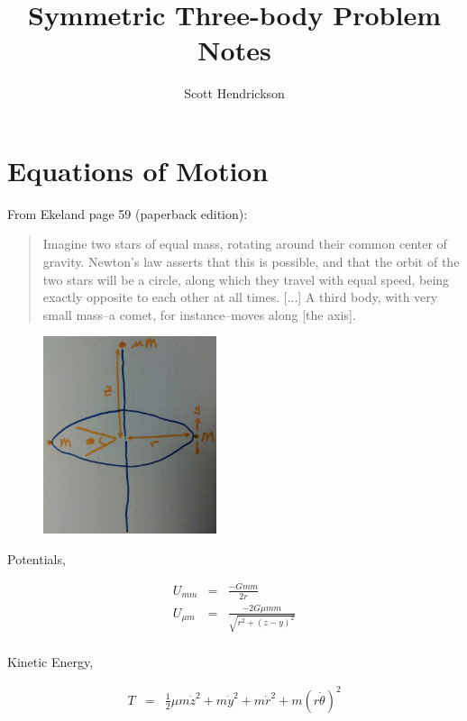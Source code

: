 \documentclass{article}
\title{Symmetric Three-body Problem Notes}
\author{Scott Hendrickson}
\begin{document}
\maketitle

\section{Equations of Motion}

\label{sec:intro}

From Ekeland page 59 (paperback edition):

\begin{quote}
Imagine two stars of equal mass, rotating around their common center of gravity. Newton's law asserts that this is possible, and that the orbit of the two stars will be a circle, along which they travel with equal speed, being exactly opposite to each other at all times. [...] A third body, with very small mass--a comet, for instance--moves along [the axis].
\end{quote}

\begin{figure}[h]
    \begin{center}
        \includegraphics[width=2.0in]{./img/3body.jpg}
    \end{center}
\label{fig:3body}
\end{figure}


Potentials,

\begin{eqnarray}
U_{m m} & = & \frac{-Gmm}{2r} \\
U_{\mu m} & = & \frac{-2G\mu mm}{\sqrt{r^2 + (z-y)^2}} \\
\label{eq:potentials}
\end{eqnarray}

Kinetic Energy,

\begin{eqnarray}
T & = & \frac{1}{2} \mu m \dot{z}^2 + m \dot{y}^2 + m \dot{r}^2 + m(r\dot{\theta})^2
\label{eq:potentials}
\end{eqnarray}
\end{document}
